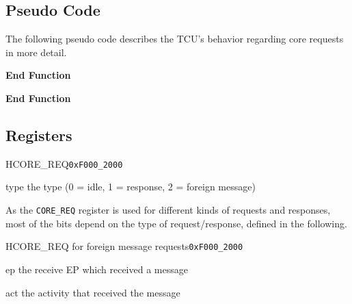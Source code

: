 \subsection{Pseudo Code}

The following pseudo code describes the TCU's behavior regarding core requests in more detail.

\begin{algorithm}[H]
    \textbf{End Function}
    \BlankLine

    \textbf{End Function}
    \caption{Enqueuing and starting of core requests.}
    \label{code:corereqstart}
\end{algorithm}

\begin{algorithm}[H]
    \caption{Dequeuing and finishing of core requests.}
    \label{code:corereqfinish}
\end{algorithm}

\subsection{Registers}

\begin{register}{H}{CORE\_REQ}{\texttt{0xF000\_2000}}
  \regnewline%
  \begin{regdesc}\begin{reglist}
    \item[type] the type (0 = idle, 1 = response, 2 = foreign message)
  \end{reglist}\end{regdesc}
\end{register}

\noindent As the \texttt{CORE\_REQ} register is used for different kinds of requests and responses,
most of the bits depend on the type of request/response, defined in the following.

\begin{register}{H}{CORE\_REQ for foreign message requests}{\texttt{0xF000\_2000}}
  \regnewline%
  \begin{regdesc}\begin{reglist}
    \item[ep] the receive EP which received a message
    \item[act] the activity that received the message
  \end{reglist}\end{regdesc}
\end{register}

